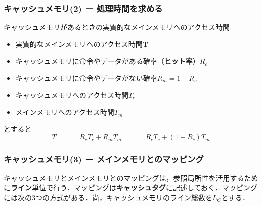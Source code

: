 \subsubsection{キャッシュメモリ(2) － 処理時間を求める}\label{sec27-2-D-10}

\begin{kousiki}{キャッシュメモリがあるときの実質的なメインメモリへのアクセス時間}
	\begin{itemize}
		\item \textsf{実質的なメインメモリへのアクセス時間$\bm{T}$}
		\item キャッシュメモリに命令やデータがある確率（\textbf{ヒット率}）$R_c$
		\item キャッシュメモリに命令やデータがない確率$R_m = 1 - R_c$
		\item キャッシュメモリへのアクセス時間$T_c$
		\item メインメモリへのアクセス時間$T_m$
	\end{itemize}
	とすると
	\begin{equation}
		T \quad = \quad R_c T_c + R_m T_m \quad = \quad R_c T_c + (1 - R_c) T_m
	\end{equation}
\end{kousiki}



\subsubsection{キャッシュメモリ(3) － メインメモリとのマッピング}\label{sec27-2-D-11}

キャッシュメモリとメインメモリとのマッピングは，参照局所性を活用するために\textbf{ライン}単位で行う．マッピングは\textbf{キャッシュタグ}に記述しておく．マッピングには次の3つの方式がある．尚，キャッシュメモリのライン総数を$L_C$とする．

